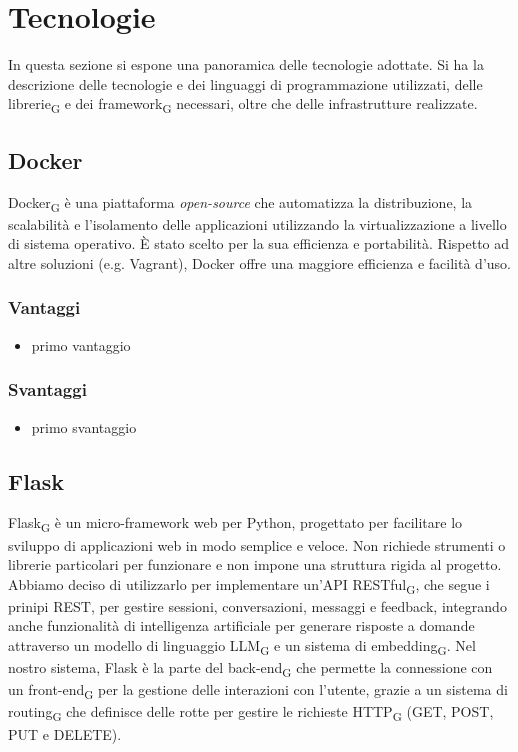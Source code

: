 \section{Tecnologie }
In questa sezione si espone una panoramica delle tecnologie adottate. Si ha la descrizione delle tecnologie e dei linguaggi di programmazione utilizzati, delle librerie\textsubscript{G} e dei framework\textsubscript{G} necessari, oltre che delle infrastrutture realizzate. 
\subsection{Docker}
Docker\textsubscript{G} è una piattaforma \textit{open-source} che automatizza la distribuzione, la scalabilità e l’isolamento delle applicazioni utilizzando la virtualizzazione a livello di sistema operativo. È stato scelto per la sua efficienza e portabilità. Rispetto ad altre soluzioni (e.g. Vagrant), Docker offre una maggiore efficienza e facilità d’uso.
\subsubsection{Vantaggi}
\begin{itemize}
    \item primo vantaggio
\end{itemize}
\subsubsection{Svantaggi}
\begin{itemize}
    \item primo svantaggio
\end{itemize}
\subsection{Flask}
Flask\textsubscript{G} è un micro-framework web per Python, progettato per facilitare lo sviluppo di applicazioni web in modo semplice e veloce. Non richiede strumenti o librerie particolari per funzionare e non impone una struttura rigida al progetto. Abbiamo deciso di utilizzarlo per implementare un'API RESTful\textsubscript{G}, che segue i prinipi REST, per gestire sessioni, conversazioni, messaggi e feedback, integrando anche funzionalità di intelligenza artificiale per generare risposte a domande attraverso un modello di linguaggio LLM\textsubscript{G} e un sistema di embedding\textsubscript{G}. Nel nostro sistema, Flask è la parte del back-end\textsubscript{G} che permette la connessione con un front-end\textsubscript{G} per la gestione delle interazioni con l'utente, grazie a un sistema di routing\textsubscript{G} che definisce delle rotte per gestire le richieste HTTP\textsubscript{G} (GET, POST, PUT e DELETE). 
